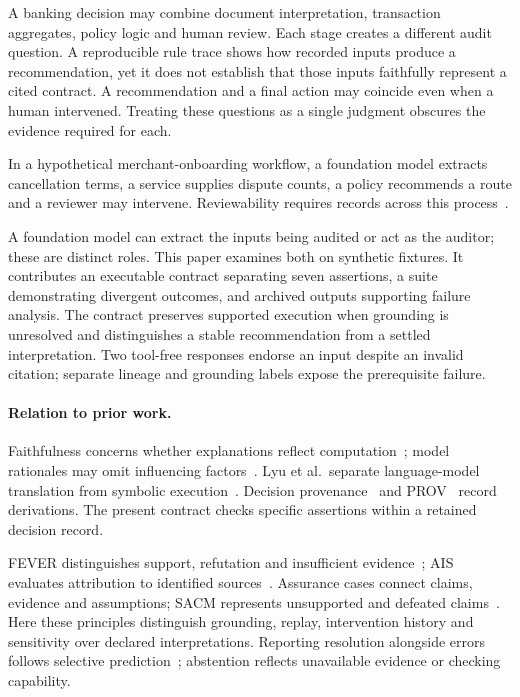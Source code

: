 \documentclass[sigconf,nonacm]{acmart}
\begin{document}
A banking decision may combine document interpretation, transaction aggregates, policy logic and human review. Each stage creates a different audit question. A reproducible rule trace shows how recorded inputs produce a recommendation, yet it does not establish that those inputs faithfully represent a cited contract. A recommendation and a final action may coincide even when a human intervened. Treating these questions as a single judgment obscures the evidence required for each.

In a hypothetical merchant-onboarding workflow, a foundation model extracts cancellation terms, a service supplies dispute counts, a policy recommends a route and a reviewer may intervene. Reviewability requires records across this process~\cite{cobbe2021reviewable}.

A foundation model can extract the inputs being audited or act as the auditor; these are distinct roles. This paper examines both on synthetic fixtures. It contributes an executable contract separating seven assertions, a suite demonstrating divergent outcomes, and archived outputs supporting failure analysis. The contract preserves supported execution when grounding is unresolved and distinguishes a stable recommendation from a settled interpretation. Two tool-free responses endorse an input despite an invalid citation; separate lineage and grounding labels expose the prerequisite failure.

\paragraph{Relation to prior work.}
Faithfulness concerns whether explanations reflect computation~\cite{jacovi2020}; model rationales may omit influencing factors~\cite{turpin2023}. Lyu et al.~separate language-model translation from symbolic execution~\cite{lyu2023}. Decision provenance~\cite{singh2019} and PROV~\cite{prov2013} record derivations. The present contract checks specific assertions within a retained decision record.

FEVER distinguishes support, refutation and insufficient evidence~\cite{thorne2018fever}; AIS evaluates attribution to identified sources~\cite{rashkin2023measuring}. Assurance cases connect claims, evidence and assumptions; SACM represents unsupported and defeated claims~\cite{sacm2023}. Here these principles distinguish grounding, replay, intervention history and sensitivity over declared interpretations. Reporting resolution alongside errors follows selective prediction~\cite{geifman2019}; abstention reflects unavailable evidence or checking capability.
\end{document}
